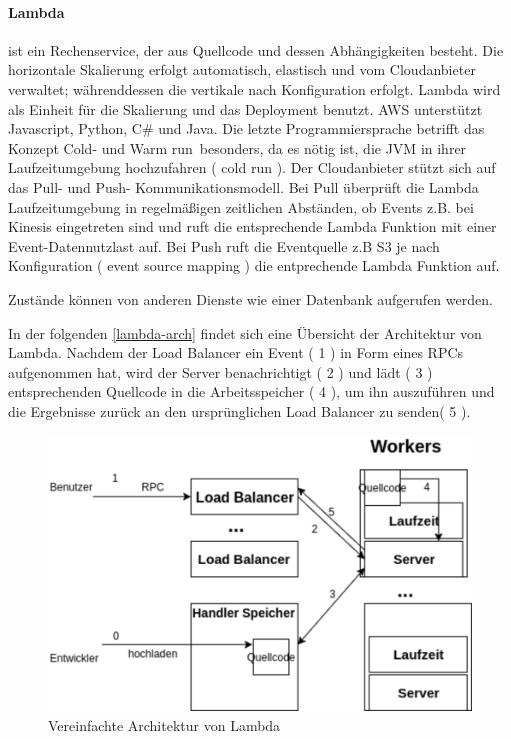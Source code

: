 \documentclass[
12pt,
english,
ngerman,
headsepline,
twoside,
openright,
numbers=noenddot,version=first
]{scrreprt}
\begin{document}
\paragraph{Lambda}\label{par:lambda} ist ein Rechenservice, der aus Quellcode und dessen Abhängigkeiten besteht. Die horizontale Skalierung erfolgt automatisch, elastisch und vom Cloudanbieter verwaltet; währenddessen die vertikale nach Konfiguration erfolgt. Lambda wird als Einheit für die Skalierung und das Deployment benutzt. \acrshort{AWS} unterstützt Javascript, Python, C\# und Java. Die letzte Programmiersprache betrifft das Konzept \glqq Cold- und Warm\label{lambda-cold-warm} run\grqq\ besonders, da es nötig ist, die \acrfull{JVM} in ihrer Laufzeitumgebung hochzufahren ( cold run ). Der Cloudanbieter stützt sich auf das Pull- und Push- Kommunikationsmodell. Bei Pull überprüft die Lambda Laufzeitumgebung in regelmäßigen zeitlichen Abständen, ob Events z.B. bei Kinesis eingetreten sind und ruft die entsprechende Lambda Funktion mit einer Event-Datennutzlast auf. Bei Push ruft die Eventquelle z.B S3 je nach Konfiguration ( event source mapping ) die entprechende Lambda Funktion auf. 

Zustände können von anderen Dienste wie einer Datenbank aufgerufen werden.


In der folgenden \autoref{lambda-arch} findet sich eine Übersicht der Architektur von Lambda. Nachdem der Load Balancer ein Event ( 1 ) in Form eines \acrfull{RPC}s aufgenommen hat, wird der Server benachrichtigt ( 2 ) und lädt ( 3 ) entsprechenden Quellcode in die Arbeitsspeicher ( 4 ), um ihn auszuführen und die Ergebnisse zurück an den ursprünglichen Load Balancer zu senden( 5 ). 

\begin{figure}[H]
	\centering{}
	\includegraphics[scale=0.60]{./pics/lambda-arch.eps}
	\caption{Vereinfachte Architektur von Lambda}
	\label{lambda-arch}
\end{figure}
\end{document}
